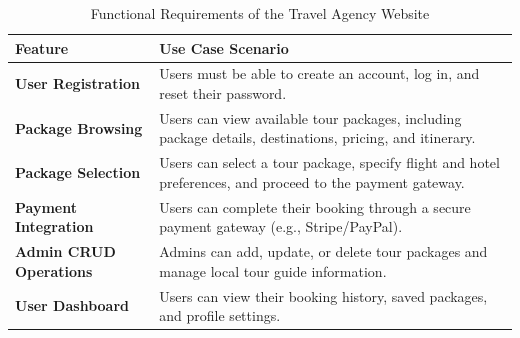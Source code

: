 \begin{table}[h]
    \caption{Functional Requirements of the Travel Agency Website}
    \vspace{0.2in}
    \centering
    \begin{tabular}{|>{\raggedright\arraybackslash}p{5cm}|>{\raggedright\arraybackslash}p{9cm}|} %
        \hline
        \textbf{Feature} & \textbf{Use Case Scenario} \\
        \hline
        \textbf{User Registration} & Users must be able to create an account, log in, and reset their password. \\
        \hline
        \textbf{Package Browsing} & Users can view available tour packages, including package details, destinations, pricing, and itinerary. \\
        \hline
        \textbf{Package Selection} & Users can select a tour package, specify flight and hotel preferences, and proceed to the payment gateway. \\
        \hline
        \textbf{Payment Integration} & Users can complete their booking through a secure payment gateway (e.g., Stripe/PayPal). \\
        \hline
        \textbf{Admin CRUD Operations} & Admins can add, update, or delete tour packages and manage local tour guide information. \\
        \hline
        \textbf{User Dashboard} & Users can view their booking history, saved packages, and profile settings. \\
        \hline
    \end{tabular}
\end{table}

\newpage

